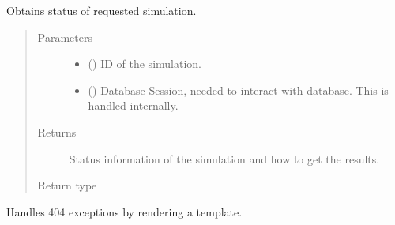 \documentclass[a4paper,landscape,10pt,english]{sphinxmanual}
\begin{document}
\begin{fulllineitems}
\label{\detokenize{code_docs/simulation_API.controller:simulation_API.controller.main.api_simulate_status_sim_id}}
Obtains status of requested simulation.
\begin{quote}\begin{description}
\item[{Parameters}] \leavevmode\begin{itemize}
\item {} 
 () \textendash{} ID of the simulation.

\item {} 
 () \textendash{} Database Session, needed to interact with database. This is handled
internally.

\end{itemize}

\item[{Returns}] \leavevmode
Status information of the simulation and how to get the results.

\item[{Return type}] \leavevmode
{\hyperref[\detokenize{code_docs/simulation_API.controller:simulation_API.controller.schemas.SimStatus}]{}}

\end{description}\end{quote}

\end{fulllineitems}


\begin{fulllineitems}
\label{\detokenize{code_docs/simulation_API.controller:simulation_API.controller.main.custom_http_exception_handler}}
Handles 404 exceptions by rendering a template.

\end{fulllineitems}
\end{document}
